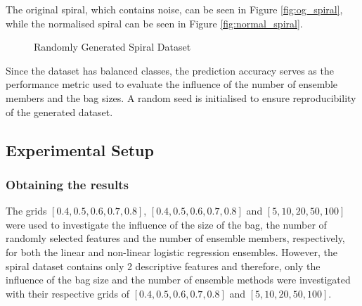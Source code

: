 \documentclass[10pt, conference]{IEEEtran}
\begin{document}
The original spiral, which contains noise, can be seen in Figure \ref{fig:og_spiral}, while the
normalised spiral can be seen in Figure \ref{fig:normal_spiral}.
\begin{figure}[H]
    \centering
    \hfil
    \caption{Randomly Generated Spiral Dataset}
    \label{fig:Spiral}
\end{figure}

Since the dataset has balanced classes, the prediction accuracy serves as the performance
metric used to evaluate the influence of the number of ensemble members and the bag sizes.
A random seed is initialised to ensure reproducibility of the generated dataset.

\subsection{Experimental Setup} \label{section: experimental_setup_emp}

\subsubsection{Obtaining the results}
The grids $[0.4, 0.5, 0.6, 0.7, 0.8]$, $[0.4, 0.5, 0.6, 0.7, 0.8]$ and $[5, 10, 20, 50, 100]$
were used to investigate the influence of the size of the bag, the number of randomly selected features and
the number of ensemble members, respectively, for both the linear and non-linear logistic regression ensembles.
However, the spiral dataset contains only 2 descriptive features and therefore, only the influence
of the bag size and the number of ensemble methods were investigated with their respective grids of
$[0.4, 0.5, 0.6, 0.7, 0.8]$ and $[5, 10, 20, 50, 100]$.
\end{document}
